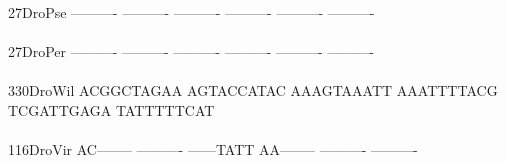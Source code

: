 \documentclass[11pt,twoside,reqno,a4paper]{article}
\begin{document}
{27\hspace*{3\charwidth}DroPse	----------	----------	----------	----------	----------	----------	\\
\hspace*{5\charwidth}\hspace*{7\charwidth}\hspace*{1\charwidth}\hspace*{1\charwidth}\hspace*{1\charwidth}\hspace*{1\charwidth}\hspace*{1\charwidth}\hspace*{1\charwidth}\\
27\hspace*{3\charwidth}DroPer	----------	----------	----------	----------	----------	----------	\\
\hspace*{5\charwidth}\hspace*{7\charwidth}\hspace*{1\charwidth}\hspace*{1\charwidth}\hspace*{1\charwidth}\hspace*{1\charwidth}\hspace*{1\charwidth}\hspace*{1\charwidth}\\
330\hspace*{2\charwidth}DroWil	ACGGCTAGAA	AGTACCATAC	AAAGTAAATT	AAATTTTACG	TCGATTGAGA	TATTTTTCAT	\\
\hspace*{5\charwidth}\hspace*{7\charwidth}\hspace*{1\charwidth}\hspace*{1\charwidth}\hspace*{1\charwidth}\hspace*{1\charwidth}\hspace*{1\charwidth}\hspace*{1\charwidth}\\
116\hspace*{2\charwidth}DroVir	AC--------	----------	------TATT	AA--------	----------	----------	\\
\hspace*{5\charwidth}\hspace*{7\charwidth}\hspace*{1\charwidth}\hspace*{1\charwidth}\hspace*{1\charwidth}\hspace*{1\charwidth}\hspace*{1\charwidth}\hspace*{1\charwidth}\\
}
\end{document}
